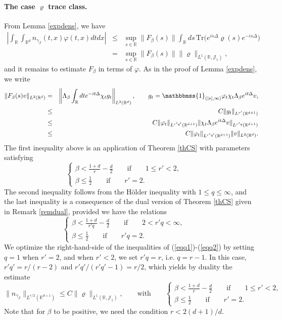 \documentclass[12pt]{article}
\def \Rm {\mathbb R}
\newcommand{\ds}{\displaystyle}
\newcommand{\Tr}{\textrm{Tr}}
\newcommand{\calJ}{\mathcal J}
\def\fref#1{{\rm (\ref{#1})}}
\def\un{{\mathbbmss{1}}}
\newcommand{\be}{\begin{equation}}
\newcommand{\ee}{\end{equation}}
\newcommand{\bee}{\begin{eqnarray*}}
\newcommand{\eee}{\end{eqnarray*}}
\begin{document}
\paragraph{The case $\varrho$ trace class.} From Lemma \ref{expdens}, we have
\bee
\left|\int_{\Rm} \int_{\Rm^d} n_{\gamma_\beta}(t,x) \varphi(t,x) dt dx \right| &\leq& \sup_{s \in \Rm} \| F_\beta(s) \| \int_\Rm ds \, \Tr \big(  e^{i s \Delta} \varrho(s) e^{- is \Delta} \big)\\
&=&\sup_{s \in \Rm} \| F_\beta(s) \| \|\varrho\|_{L^1(\Rm,\calJ_1)},
\eee
and it remains to estimate $F_\beta$ in terms of $\varphi$. As in the proof of Lemma \ref{expdens}, we write
\bee
\| F_\beta(s) v \|_{L^2(\Rm^d)}&=&\left\| \Lambda_{\beta} \int_\Rm dt  e^{-i t \Delta } \chi_t g_t \right\|_{L^2(\Rm^d)}, \qquad g_t=\un_{(|s|,\infty)} \varphi_t \chi_t  \Lambda_{\beta}  e^{i t \Delta } v,\\
&\leq & C \|g_t \|_{L^{r'}(\Rm^{d+1})}\\
& \leq & C  \|\varphi_t\|_{L^{r'q'}(\Rm^{d+1})} \|\chi_t  \Lambda_{\beta}  e^{i t \Delta } v\|_{L^{r'q}(\Rm^{d+1})}\\
&\leq & C \|\varphi_t\|_{L^{r'q'}(\Rm^{d+1})} \|v\|_{L^2(\Rm^d)}.
\eee
The first inequality above is an application of Theorem \ref{thCS} with parameters satisfying
\be \label{eqq1}
\left\{\begin{array}{l}
\ds \beta < \frac{1+d}{r}-\frac{d}{2} \qquad \textrm{if} \qquad 1 \leq r' <2, \qquad \\
\ds \beta\leq \frac{1}{2} \qquad \textrm{if} \qquad r'=2.
\end{array} \right.
\ee
The second inequality follows from the H\"older inequality with $1\leq q \leq \infty$, and the last inequality is a consequence of the dual version of Theorem \ref{thCS} given in Remark \ref{remdual}, provided we have the relations
\be \label{eqq2}
\left\{\begin{array}{l}
\ds \beta < \frac{1+d}{r' q}-\frac{d}{2} \qquad \textrm{if} \qquad 2< r'q <\infty, \qquad \\
\ds \beta\leq \frac{1}{2} \qquad \textrm{if} \qquad r'q=2.
\end{array} \right.
\ee
We optimize the right-hand-side of the inequalities of \fref{eqq1}-\fref{eqq2} by setting $q=1$ when $r'=2$, and when $r'<2$, we set $r'q=r$, i.e. $q=r-1$. In this case, $r'q'=r/(r-2)$ and $r'q'/(r'q'-1)=r/2$, which yields by duality the estimate
$$
\|n_{\gamma_\beta}\|_{L^{r/2}(\Rm^{d+1})} \leq C \|\varrho\|_{L^1(\Rm,\calJ_1)}, \qquad \textrm{with} \qquad \left\{\begin{array}{l}
\ds \beta < \frac{1+d}{r}-\frac{d}{2} \qquad \textrm{if} \qquad 1\leq r'<2, \qquad \\
\ds \beta\leq \frac{1}{2} \qquad \textrm{if} \qquad r'=2.
\end{array} \right.
$$
Note that for $\beta$ to be positive, we need the condition $r < 2(d+1)/d$.
\end{document}
